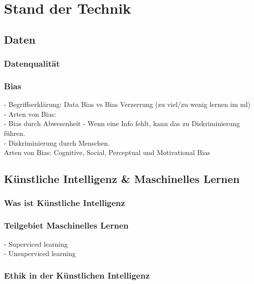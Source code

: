\chapter{Stand der Technik}
    \label{sec:theorie/standdertechnik}

    \section{Daten}
    \label{subsec:daten}
    
    \subsection{Datenqualität}
    \label{subsubsec:datenqualität}

    \subsection{Bias}
    \label{subsubsec:Bias}
    -   Begriffserklärung: Data Bias vs Bias Verzerrung (zu viel/zu wenig lernen im ml)\\
    -   Arten von Bias: \\
        -   Bias durch Abwesenheit - Wenn eine Info fehlt, kann das zu Diskriminierung führen. \\
        -   Diskriminierung durch Menschen. \\
    Arten von Bias: Cognitive, Social, Perceptual und Motivational Bias \cite{8768554}


    \section{Künstliche Intelligenz \& Maschinelles Lernen}
    \label{subsec:KIandML}

    \subsection{Was ist Künstliche Intelligenz}
    \label{subsec:wasistKI}

    \subsection{Teilgebiet Maschinelles Lernen}
    \label{subsubsec:teilgebietML}
    -   Superviced learning \\
    -   Unsuperviced learning \\

    \subsection{Ethik in der Künstlichen Intelligenz}
    \label{subsubsec:ethikinderKI}

